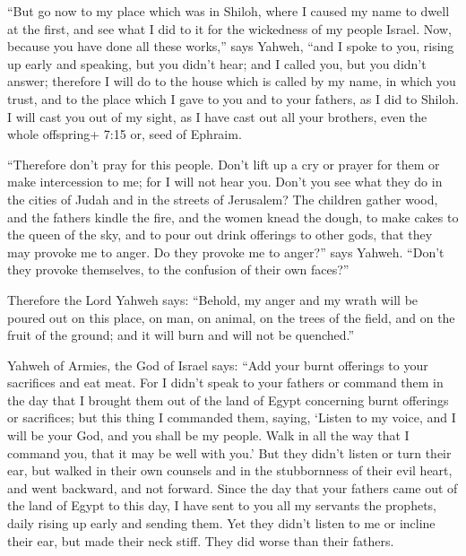  ``But go now to my place which was in Shiloh, where I
caused my name to dwell at the first, and see what I did to it for the
wickedness of my people Israel.  Now, because you have done
all these works,'' says Yahweh, ``and I spoke to you, rising up early
and speaking, but you didn't hear; and I called you, but you didn't
answer;  therefore I will do to the house which is called
by my name, in which you trust, and to the place which I gave to you and
to your fathers, as I did to Shiloh.  I will cast you out
of my sight, as I have cast out all your brothers, even the whole
offspring+ 7:15 or, seed of Ephraim.

 ``Therefore don't pray for this people. Don't lift up a
cry or prayer for them or make intercession to me; for I will not hear
you.  Don't you see what they do in the cities of Judah and
in the streets of Jerusalem?  The children gather wood, and
the fathers kindle the fire, and the women knead the dough, to make
cakes to the queen of the sky, and to pour out drink offerings to other
gods, that they may provoke me to anger.  Do they provoke
me to anger?'' says Yahweh. ``Don't they provoke themselves, to the
confusion of their own faces?''

 Therefore the Lord Yahweh says: ``Behold, my anger and my
wrath will be poured out on this place, on man, on animal, on the trees
of the field, and on the fruit of the ground; and it will burn and will
not be quenched.''

 Yahweh of Armies, the God of Israel says: ``Add your burnt
offerings to your sacrifices and eat meat.  For I didn't
speak to your fathers or command them in the day that I brought them out
of the land of Egypt concerning burnt offerings or sacrifices;
 but this thing I commanded them, saying, `Listen to my
voice, and I will be your God, and you shall be my people. Walk in all
the way that I command you, that it may be well with you.' 
But they didn't listen or turn their ear, but walked in their own
counsels and in the stubbornness of their evil heart, and went backward,
and not forward.  Since the day that your fathers came out
of the land of Egypt to this day, I have sent to you all my servants the
prophets, daily rising up early and sending them.  Yet they
didn't listen to me or incline their ear, but made their neck stiff.
They did worse than their fathers.

